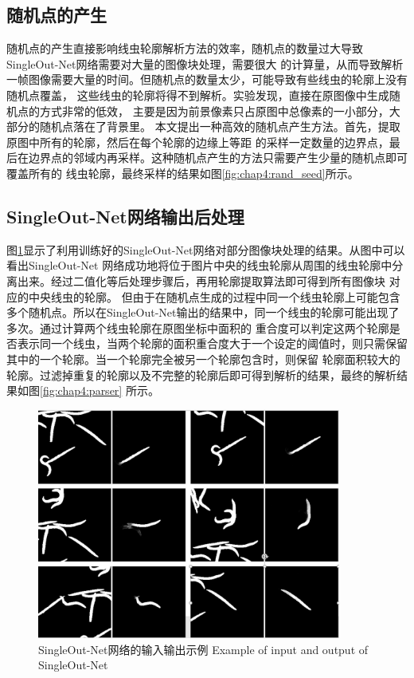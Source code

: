 \subsection{随机点的产生}
	随机点的产生直接影响线虫轮廓解析方法的效率，随机点的数量过大导致SingleOut-Net网络需要对大量的图像块处理，需要很大
	的计算量，从而导致解析一帧图像需要大量的时间。但随机点的数量太少，可能导致有些线虫的轮廓上没有随机点覆盖，
	这些线虫的轮廓将得不到解析。实验发现，直接在原图像中生成随机点的方式非常的低效，
	主要是因为前景像素只占原图中总像素的一小部分，大部分的随机点落在了背景里。
	本文提出一种高效的随机点产生方法。首先，提取原图中所有的轮廓，然后在每个轮廓的边缘上等距
	的采样一定数量的边界点，最后在边界点的邻域内再采样。这种随机点产生的方法只需要产生少量的随机点即可覆盖所有的
	线虫轮廓，最终采样的结果如图\ref{fig:chap4:rand_seed}所示。

\subsection{SingleOut-Net网络输出后处理}
	图\ref{fig:chap4:singleout}显示了利用训练好的SingleOut-Net网络对部分图像块处理的结果。从图中可以看出SingleOut-Net
	网络成功地将位于图片中央的线虫轮廓从周围的线虫轮廓中分离出来。经过二值化等后处理步骤后，再用轮廓提取算法即可得到所有图像块
	对应的中央线虫的轮廓。
	但由于在随机点生成的过程中同一个线虫轮廓上可能包含
	多个随机点。所以在SingleOut-Net输出的结果中，同一个线虫的轮廓可能出现了多次。通过计算两个线虫轮廓在原图坐标中面积的
	重合度可以判定这两个轮廓是否表示同一个线虫，当两个轮廓的面积重合度大于一个设定的阈值时，则只需保留其中的一个轮廓。当一个轮廓完全被另一个轮廓包含时，则保留
	轮廓面积较大的轮廓。过滤掉重复的轮廓以及不完整的轮廓后即可得到解析的结果，最终的解析结果如图\ref{fig:chap4:parser}
	所示。
	\begin{figure}[!h]
	  \centering
	  \includegraphics[width=10cm]{figure/chap4/singleout.jpg}
	  \bicaption
		{SingleOut-Net网络的输入输出示例}
		{Example of input and output of SingleOut-Net}
	  \label{fig:chap4:singleout}
	\end{figure}

